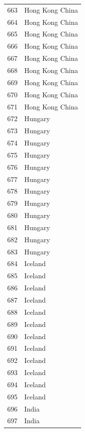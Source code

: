 \documentclass[
  letterpaper,
  DIV=11,
  numbers=noendperiod]{scrreprt}
\begin{document}
\begin{tabular}{ll}
663  &           Hong Kong China \\
664  &           Hong Kong China \\
665  &           Hong Kong China \\
666  &           Hong Kong China \\
667  &           Hong Kong China \\
668  &           Hong Kong China \\
669  &           Hong Kong China \\
670  &           Hong Kong China \\
671  &           Hong Kong China \\
672  &                   Hungary \\
673  &                   Hungary \\
674  &                   Hungary \\
675  &                   Hungary \\
676  &                   Hungary \\
677  &                   Hungary \\
678  &                   Hungary \\
679  &                   Hungary \\
680  &                   Hungary \\
681  &                   Hungary \\
682  &                   Hungary \\
683  &                   Hungary \\
684  &                   Iceland \\
685  &                   Iceland \\
686  &                   Iceland \\
687  &                   Iceland \\
688  &                   Iceland \\
689  &                   Iceland \\
690  &                   Iceland \\
691  &                   Iceland \\
692  &                   Iceland \\
693  &                   Iceland \\
694  &                   Iceland \\
695  &                   Iceland \\
696  &                     India \\
697  &                     India \\

\end{tabular}
\end{document}
